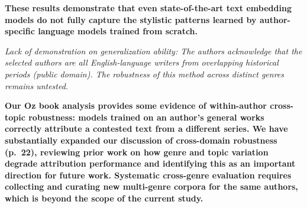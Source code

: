 \documentclass[11pt]{article}
\newcommand{\pref}[1]{p.~#1}
\begin{document}
\textbf{These results demonstrate that even state-of-the-art text embedding
models do not fully capture the stylistic patterns learned by author-specific
language models trained from scratch.}

\textit{Lack of demonstration on generalization ability: The authors
acknowledge that the selected authors are all English-language writers from
overlapping historical periods (public domain). The robustness of this method
across distinct genres remains untested.}

\textbf{Our Oz book analysis provides some evidence of within-author
cross-topic robustness: models trained on an author's general works correctly
attribute a contested text from a different series. We have substantially
expanded our discussion of cross-domain robustness (\pref{22}), reviewing
prior work on how genre and topic variation degrade attribution performance
and identifying this as an important direction for future work.
Systematic cross-genre evaluation requires collecting and curating new
multi-genre corpora for the same authors, which is beyond the scope of the
current study.}
\end{document}
